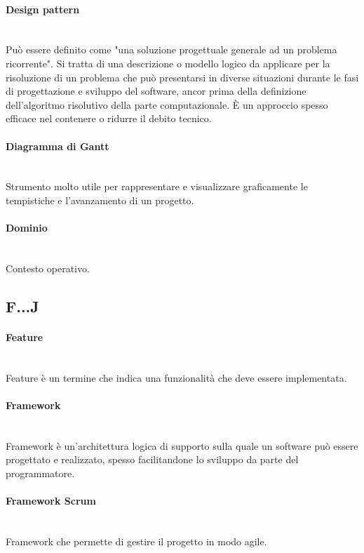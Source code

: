 \paragraph{Design pattern}~\smallskip \\
Può essere definito come "una soluzione progettuale generale ad un problema ricorrente".
Si tratta di una descrizione o modello logico da applicare per la risoluzione di un problema che può 
presentarsi in diverse situazioni durante le fasi di progettazione e sviluppo del software, ancor prima della definizione 
dell'algoritmo risolutivo della parte computazionale. È un approccio spesso efficace nel contenere o ridurre il debito tecnico.

\paragraph{Diagramma di Gantt}~\smallskip \\
Strumento molto utile per rappresentare e visualizzare graficamente le tempistiche e l'avanzamento di un progetto.

\paragraph{Dominio}~\smallskip \\
Contesto operativo.

\subsection{F...J}

\paragraph{Feature}~\smallskip \\
Feature è un termine che indica una funzionalità che deve essere implementata.

\paragraph{Framework}~\smallskip \\
Framework è un'architettura logica di supporto sulla quale un software può essere progettato e realizzato, spesso facilitandone lo sviluppo da parte del programmatore.

\paragraph{Framework Scrum}~\smallskip \\
Framework che permette di gestire il progetto in modo agile.

